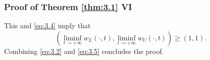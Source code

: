 
\begin{frame}
    \frametitle{Proof of Theorem \ref{thm:3.1} VI}
    \begin{proofe}
        This and \eqref{eq:3.4} imply that
        \begin{equation}
            (\liminf_{t \to +\infty} w_L(\cdot, t), \liminf_{t \to +\infty} w_U(\cdot, t)) \geq (1, 1).
            \label{eq:3.5}
        \end{equation}
        Combining \eqref{eq:3.2} and \eqref{eq:3.5} concludes the proof.
    \end{proofe}
\end{frame}
        